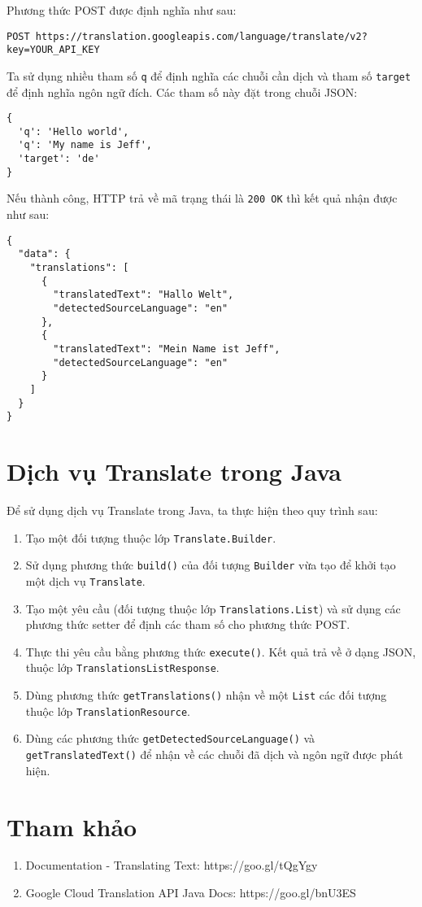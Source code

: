 \documentclass[../thesis.tex]{subfiles}
\begin{document}
Phương thức POST được định nghĩa như sau:

\begin{lstlisting}[numbers=none, frame=single,xleftmargin=0.15cm,xrightmargin=0.15cm]
POST https://translation.googleapis.com/language/translate/v2?key=YOUR_API_KEY
\end{lstlisting}

Ta sử dụng nhiều tham số \lstinline{q} để định nghĩa các chuỗi cần dịch và tham số \lstinline{target} để định nghĩa ngôn ngữ đích. Các tham số này đặt trong chuỗi JSON:

\begin{lstlisting}[numbers=none, frame=single,xleftmargin=0.15cm,xrightmargin=0.15cm]
{
  'q': 'Hello world',
  'q': 'My name is Jeff',
  'target': 'de'
}
\end{lstlisting}

Nếu thành công, HTTP trả về mã trạng thái là \lstinline{200 OK} thì kết quả nhận được như sau:

\begin{lstlisting}[numbers=none, frame=single,xleftmargin=0.15cm,xrightmargin=0.15cm]
{
  "data": {
    "translations": [
      {
        "translatedText": "Hallo Welt",
        "detectedSourceLanguage": "en"
      },
      {
        "translatedText": "Mein Name ist Jeff",
        "detectedSourceLanguage": "en"
      }
    ]
  }
} 
\end{lstlisting}

\section{Dịch vụ Translate trong Java}
Để sử dụng dịch vụ Translate trong Java, ta thực hiện theo quy trình sau:
\begin{enumerate}
  \item Tạo một đối tượng thuộc lớp \lstinline{Translate.Builder}.
  \item Sử dụng phương thức \lstinline{build()} của đối tượng \lstinline{Builder} vừa tạo để khởi tạo một dịch vụ \lstinline{Translate}.
  \item Tạo một yêu cầu (đối tượng thuộc lớp \lstinline{Translations.List}) và sử dụng các phương thức setter để định các tham số cho phương thức POST.
  \item Thực thi yêu cầu bằng phương thức \lstinline{execute()}. Kết quả trả về ở dạng JSON, thuộc lớp \lstinline{TranslationsListResponse}.
  \item Dùng phương thức \lstinline{getTranslations()} nhận về một \lstinline{List} các đối tượng thuộc lớp \lstinline{TranslationResource}.
  \item Dùng các phương thức \lstinline{getDetectedSourceLanguage()} và \lstinline{getTranslatedText()} để nhận về các chuỗi đã dịch và ngôn ngữ được phát hiện.
\end{enumerate}

\section*{Tham khảo}

\begin{enumerate}
  \item Documentation - Translating Text: https://goo.gl/tQgYgy
  \item Google Cloud Translation API Java Docs: https://goo.gl/bnU3ES
\end{enumerate}
\end{document}

